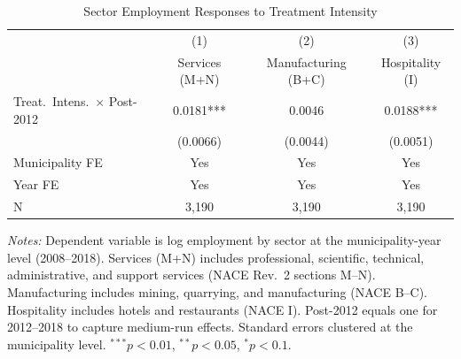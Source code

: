 \begin{table}[htbp]
\centering
\caption{Sector Employment Responses to Treatment Intensity}
\label{tab:sectors}
\begin{tabular}{lccc}
\hline\hline
 & (1) & (2) & (3) \\
 & Services (M+N) & Manufacturing (B+C) & Hospitality (I) \\
\hline
Treat.\ Intens.\ $\times$ Post-2012 & 0.0181*** & 0.0046 & 0.0188*** \\
 & (0.0066) & (0.0044) & (0.0051) \\
\hline
Municipality FE & Yes & Yes & Yes \\
Year FE & Yes & Yes & Yes \\
N & 3,190 & 3,190 & 3,190 \\
\hline\hline
\end{tabular}
\begin{minipage}{0.95\textwidth}
\vspace{0.3em}\footnotesize
\textit{Notes:} Dependent variable is log employment by sector at the municipality-year level (2008--2018). Services (M+N) includes professional, scientific, technical, administrative, and support services (NACE Rev.\ 2 sections M--N). Manufacturing includes mining, quarrying, and manufacturing (NACE B--C). Hospitality includes hotels and restaurants (NACE I). Post-2012 equals one for 2012--2018 to capture medium-run effects. Standard errors clustered at the municipality level. $^{***}p<0.01$, $^{**}p<0.05$, $^{*}p<0.1$.
\end{minipage}
\end{table}

